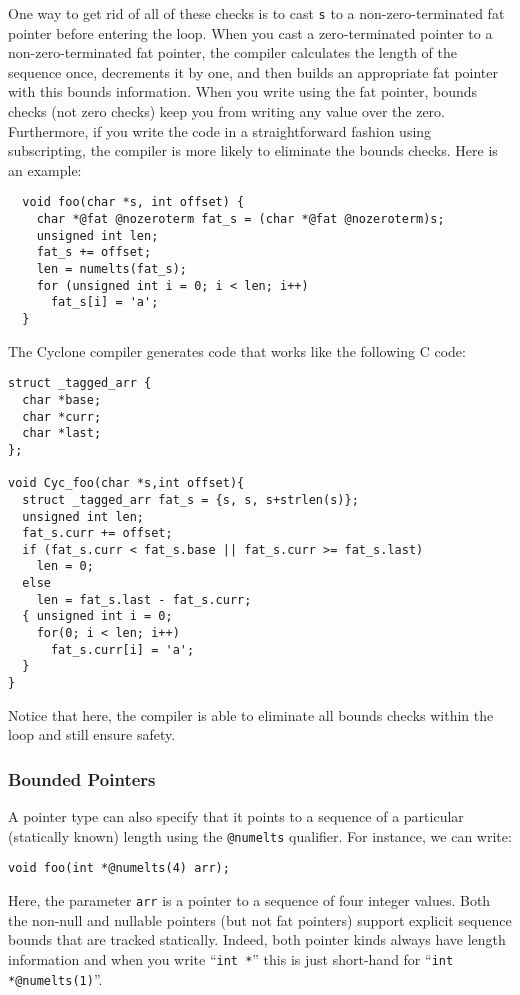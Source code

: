 One way to get rid of all of these checks is to cast \texttt{s} to a
non-zero-terminated fat pointer before entering the loop.  When you
cast a zero-terminated pointer to a non-zero-terminated fat pointer,
the compiler calculates the length of the sequence once, decrements it
by one, and then builds an appropriate fat pointer with this bounds
information.  When you write using the fat pointer, bounds checks (not
zero checks) keep you from writing any value over the zero.
Furthermore, if you write the code in a straightforward fashion using
subscripting, the compiler is more likely to eliminate the bounds
checks.  Here is an example:
\begin{verbatim}
  void foo(char *s, int offset) {
    char *@fat @nozeroterm fat_s = (char *@fat @nozeroterm)s;
    unsigned int len; 
    fat_s += offset;
    len = numelts(fat_s);    
    for (unsigned int i = 0; i < len; i++)
      fat_s[i] = 'a';
  }
\end{verbatim}
The Cyclone compiler generates code that works like the following C code:
\begin{verbatim}
struct _tagged_arr { 
  char *base;
  char *curr;
  char *last;
};

void Cyc_foo(char *s,int offset){
  struct _tagged_arr fat_s = {s, s, s+strlen(s)};
  unsigned int len;
  fat_s.curr += offset;
  if (fat_s.curr < fat_s.base || fat_s.curr >= fat_s.last) 
    len = 0;
  else 
    len = fat_s.last - fat_s.curr;
  { unsigned int i = 0;
    for(0; i < len; i++)
      fat_s.curr[i] = 'a';
  }
}
\end{verbatim}
Notice that here, the compiler is able to eliminate all bounds
checks within the loop and still ensure safety.

\subsubsection*{Bounded Pointers}

A pointer type can also specify that it points to a
sequence of a particular (statically known) length using the
\texttt{@numelts} qualifier.  For instance, we can write:
\begin{verbatim}
void foo(int *@numelts(4) arr);
\end{verbatim}
Here, the parameter \texttt{arr} is a pointer to a sequence of four
integer values.  Both the non-null and nullable pointers (but not fat
pointers) support explicit sequence bounds that are tracked
statically.  Indeed, both pointer kinds always have length information
and when you write ``\texttt{int *}'' this is just short-hand for
``\texttt{int *@numelts(1)}''.


